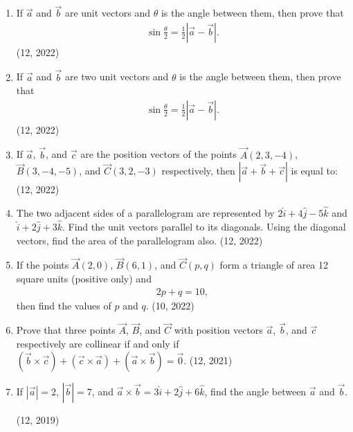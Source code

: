 \begin{enumerate}[label=\thesubsection.\arabic*,ref=\thesubsection.\theenumi]
    \item If $\overrightarrow{a}$ and $\overrightarrow{b}$ are unit vectors and $\theta$ is the angle between them, then prove that
    \begin{align*}
        \sin \frac{\theta}{2} = \frac{1}{2} \left| \overrightarrow{a} - \overrightarrow{b} \right|.
    \end{align*}
    \hfill (12, 2022)

    \item If $\overrightarrow{a}$ and $\overrightarrow{b}$ are two unit vectors and $\theta$ is the angle between them, then prove that
    \begin{align*}
        \sin \frac{\theta}{2} = \frac{1}{2} \left| \overrightarrow{a} - \overrightarrow{b} \right|.
    \end{align*}
    \hfill (12, 2022)
    \item If $\overrightarrow{a}$, $\overrightarrow{b}$, and $\overrightarrow{c}$ are the position vectors of the points $\vec{A}(2, 3, -4)$, $\vec{B}(3, -4, -5)$, and $\vec{C}(3, 2, -3)$ respectively, then $\left| \overrightarrow{a} + \overrightarrow{b} + \overrightarrow{c} \right|$ is equal to:
    \hfill (12, 2022)
    \item The two adjacent sides of a parallelogram are represented by $2\hat{i} + 4\hat{j} - 5\hat{k}$ and $\hat{i} + 2\hat{j} + 3\hat{k}$. Find the unit vectors parallel to its diagonals. Using the diagonal vectors, find the area of the parallelogram also.
    \hfill (12, 2022)
    \item If the points $\vec{A}(2,0)$, $\vec{B}(6,1)$, and $\vec{C}(p, q)$ form a triangle of area 12 square units (positive only) and
    \begin{align*}
        2p + q = 10,
    \end{align*}
    then find the values of $p$ and $q$.
    \hfill (10, 2022)
	\item Prove that three points $\vec{A}$, $\vec{B}$, and $\vec{C}$ with position vectors $\vec{a}$, $\vec{b}$, and $\vec{c}$ respectively are collinear if and only if $(\vec{b} \times \vec{c}) + (\vec{c} \times \vec{a}) + (\vec{a} \times \vec{b}) = \vec{0}$. \hfill (12, 2021)
	\item If $|\overrightarrow{a}| = 2$, $|\overrightarrow{b}| = 7$, and $\overrightarrow{a} \times \overrightarrow{b} = 3\hat{i} + 2\hat{j} + 6\hat{k}$, find the angle between $\overrightarrow{a}$ and $\overrightarrow{b}$. 

		\hfill (12, 2019)
	

\end{enumerate}
